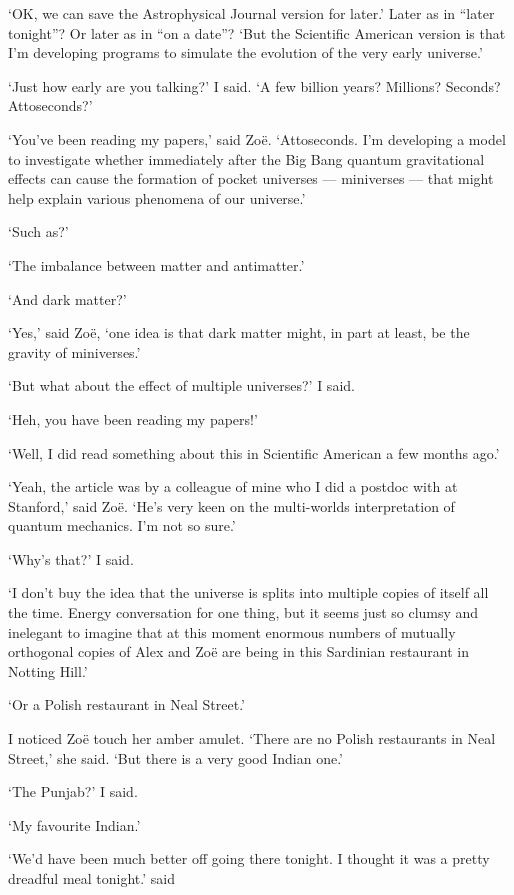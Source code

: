 `OK, we can save the {\twelvesl Astrophysical Journal\/} version for
later.' Later as in ``later tonight''? Or later as in ``on a date''?
`But the {\twelvesl Scientific American\/} version is that I'm
developing programs to simulate the evolution of the very early
universe.'

`Just how early are you talking?' I said. `A few billion years?
Millions? Seconds? Attoseconds?'

`You've been reading my papers,' said Zo{\"e}. `Attoseconds. I'm developing a model
to investigate whether immediately after the Big Bang quantum
gravitational effects can cause the formation of pocket universes --- miniverses ---
that might help explain various phenomena of our universe.'

`Such as?'

`The imbalance between matter and antimatter.'

`And dark matter?'

`Yes,' said Zo{\"e}, `one idea is that dark matter might, in part at least, be the
gravity of miniverses.'

`But what about the effect of multiple universes?' I said.

`Heh, you {\twelveit have\/} been reading my papers!'

`Well, I did read something about this in {\twelvesl Scientific
American\/} a few months ago.'

`Yeah, the article was by a colleague of mine who I did a postdoc
with at Stanford,' said Zo{\"e}. `He's very keen on the multi-worlds interpretation of quantum mechanics. I'm not so sure.'

`Why's that?' I said.

`I don't buy the idea that the universe is splits
into multiple copies of itself all the time. Energy conversation for one
thing, but it seems just so clumsy and {\twelveit
inelegant} to imagine that at this moment enormous numbers of mutually orthogonal copies of Alex and Zo{\"e} are being in this Sardinian restaurant in Notting Hill.'

`Or a Polish restaurant in Neal Street.'

I noticed Zo{\"e} touch her amber amulet. `There are no Polish restaurants in Neal Street,' she said. `But there is a very good Indian one.'

`The Punjab?' I said.

`My favourite Indian.'

`We'd have been much better off going there tonight. I thought it was a pretty dreadful meal tonight.' said

